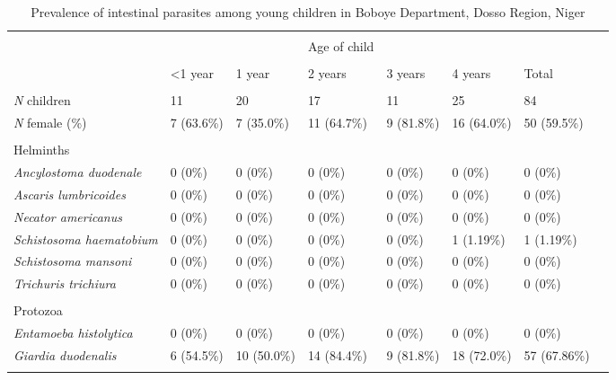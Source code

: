 \documentclass[10pt,letterpaper]{article}
\begin{document}


\begin{table}[!htbp] \centering 
  \caption{Prevalence of intestinal parasites among young children in Boboye Department, Dosso Region, Niger} 
  \label{} 
\begin{tabular}{@{\extracolsep{5pt}} llllllll} 
\\[-1.8ex]\hline 
\hline \\[-1.8ex] 
  &  &  & Age of child &  &  &  \\ 
\hline \\[-1.8ex] 
  & \textless  1 year & 1 year & 2 years & 3 years & 4 years & Total \\ 
\hline \\[-1.8ex] 
\textit{N} children & 11 & 20 & 17 & 11 & 25 & 84 \\ 
\textit{N} female (\%) & 7 (63.6\%) & 7 (35.0\%) & 11 (64.7\%) & 9 (81.8\%) & 16 (64.0\%) & 50 (59.5\%) \\ 
  &  &  &  &  &  &  \\ 
Helminths &  &  &  &  &  &  \\ 
\textit{     Ancylostoma duodenale} & 0 (0\%) & 0 (0\%) & 0 (0\%) & 0 (0\%) & 0 (0\%) & 0 (0\%) \\ 
\textit{     Ascaris lumbricoides} & 0 (0\%) & 0 (0\%) & 0 (0\%) & 0 (0\%) & 0 (0\%) & 0 (0\%) \\ 
\textit{     Necator americanus} & 0 (0\%) & 0 (0\%) & 0 (0\%) & 0 (0\%) & 0 (0\%) & 0 (0\%) \\ 
\textit{     Schistosoma haematobium} & 0 (0\%) & 0 (0\%) & 0 (0\%) & 0 (0\%) & 1 (1.19\%) & 1 (1.19\%) \\ 
\textit{     Schistosoma mansoni} & 0 (0\%) & 0 (0\%) & 0 (0\%) & 0 (0\%) & 0 (0\%) & 0 (0\%) \\ 
\textit{     Trichuris trichiura} & 0 (0\%) & 0 (0\%) & 0 (0\%) & 0 (0\%) & 0 (0\%) & 0 (0\%) \\ 
  &  &  &  &  &  &  \\ 
Protozoa &  &  &  &  &  &  \\ 
\textit{     Entamoeba histolytica} & 0 (0\%) & 0 (0\%) & 0 (0\%) & 0 (0\%) & 0 (0\%) & 0 (0\%) \\ 
\textit{     Giardia duodenalis} & 6 (54.5\%) & 10 (50.0\%) & 14 (84.4\%) & 9 (81.8\%) & 18 (72.0\%) & 57 (67.86\%) \\ 
\hline \\[-1.8ex] 
\end{tabular} 
\end{table} 
\end{document}

